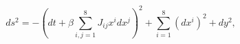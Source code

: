 \begin{equation}
\label{metn4iia1}
ds^2 = - \left( dt + \beta \sum_{i,j=1}^{8} J_{ij} x^i dx^j \right)^2
+ \sum_{i=1}^8 (dx^i)^2 + dy^2,
\end{equation}

